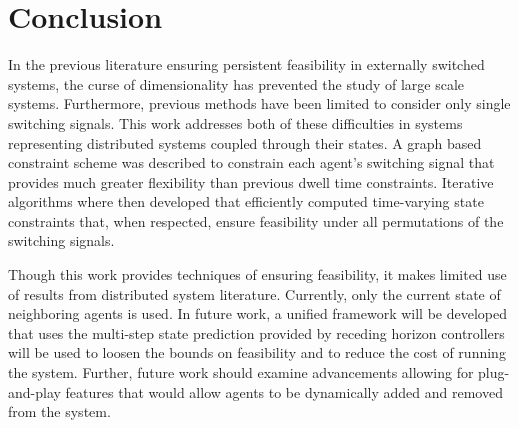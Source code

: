 \section{Conclusion}
In the previous literature ensuring persistent feasibility in externally switched systems, the curse of dimensionality has prevented the study of large scale systems. Furthermore, previous methods have been limited to consider only single switching signals. This work addresses both of these difficulties in systems representing distributed systems coupled through their states. A graph based constraint scheme was described to constrain each agent's switching signal that provides much greater flexibility than previous dwell time constraints. Iterative algorithms where then developed that efficiently computed time-varying state constraints that, when respected, ensure feasibility under all permutations of the switching signals. 

Though this work provides techniques of ensuring feasibility, it makes limited use of results from distributed system literature. Currently, only the current state of neighboring agents is used. In future work, a unified framework will be developed that uses the multi-step state prediction provided by receding horizon controllers will be used to loosen the bounds on feasibility and to reduce the cost of running the system. Further, future work should examine advancements allowing for plug-and-play features that would allow agents to be dynamically added and removed from the system. 